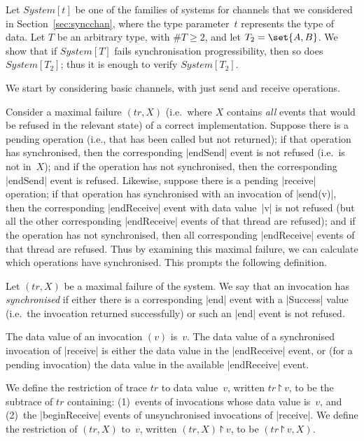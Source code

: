 Let $System[t]$ be one of the families of systems for channels that we
considered in Section~\ref{sec:syncchan}, where the type parameter~$t$
represents the type of data.  Let $T$ be an arbitrary type, with $\#T \ge 2$,
and let $T_2 = \set{A,B}$.  We show that if $System[T]$ fails synchronisation
progressibility, then so does $System[T_2]$; thus it is enough to verify
$System[T_2]$.

We start by considering basic channels, with just send and receive
operations. 

Consider a maximal failure $(tr,X)$ (i.e.~where $X$ contains \emph{all} events
that would be refused in the relevant state) of a correct implementation.
Suppose there is a pending  operation (i.e., that has been called
but not returned); if that operation has synchronised, then the corresponding
|endSend| event is not refused (i.e.~is not in~$X$); and if the operation has
not synchronised, then the corresponding |endSend| event is refused.
Likewise, suppose there is a pending |receive| operation; if that operation
has synchronised with an invocation of |send(v)|, then the corresponding
|endReceive| event with data value~|v| is not refused (but all the other
corresponding |endReceive| events of that thread are refused); and if the
operation has not synchronised, then all corresponding |endReceive| events of
that thread are refused.  Thus by examining this maximal failure, we can
calculate which operations have synchronised.  This prompts the following
definition.
%
\begin{definition}
\label{def:synchronised}
Let $(tr,X)$ be a maximal failure of the system.  We say that an invocation
has \emph{synchronised} if either there is a corresponding |end| event with
a |Success| value (i.e.~the invocation returned successfully) or such an
|end| event is not refused.

The data value of an invocation $(v)$ is~$v$.  The data value of a
synchronised invocation of |receive| is either the data value in the
|endReceive| event, or (for a pending invocation) the data value in the
available |endReceive| event.
\end{definition}

\begin{definition}
\label{def:project}
We define the restriction of trace $tr$ to data value~$v$, written $tr
\project v$, to be the subtrace of $tr$ containing: (1)~events of invocations
whose data value is~$v$, and (2)~the |beginReceive| events of unsynchronised
invocations of |receive|.  We define the restriction of $(tr,X)$ to~$v$,
written $(tr,X) \project v$, to be $(tr \project v, X)$.
\end{definition}

